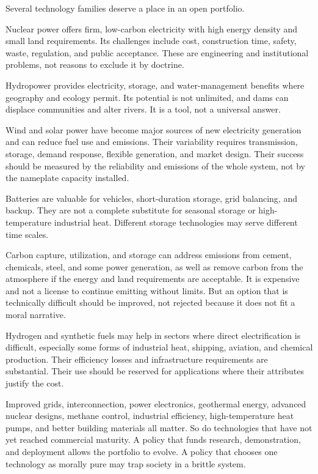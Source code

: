 ﻿\documentclass[12pt,a4paper]{book}
\begin{document}
Several technology families deserve a place in an open portfolio.

Nuclear power offers firm, low-carbon electricity with high energy density and small land requirements. Its challenges include cost, construction time, safety, waste, regulation, and public acceptance. These are engineering and institutional problems, not reasons to exclude it by doctrine.

Hydropower provides electricity, storage, and water-management benefits where geography and ecology permit. Its potential is not unlimited, and dams can displace communities and alter rivers. It is a tool, not a universal answer.

Wind and solar power have become major sources of new electricity generation and can reduce fuel use and emissions. Their variability requires transmission, storage, demand response, flexible generation, and market design. Their success should be measured by the reliability and emissions of the whole system, not by the nameplate capacity installed.

Batteries are valuable for vehicles, short-duration storage, grid balancing, and backup. They are not a complete substitute for seasonal storage or high-temperature industrial heat. Different storage technologies may serve different time scales.

Carbon capture, utilization, and storage can address emissions from cement, chemicals, steel, and some power generation, as well as remove carbon from the atmosphere if the energy and land requirements are acceptable. It is expensive and not a license to continue emitting without limits. But an option that is technically difficult should be improved, not rejected because it does not fit a moral narrative.

Hydrogen and synthetic fuels may help in sectors where direct electrification is difficult, especially some forms of industrial heat, shipping, aviation, and chemical production. Their efficiency losses and infrastructure requirements are substantial. Their use should be reserved for applications where their attributes justify the cost.

Improved grids, interconnection, power electronics, geothermal energy, advanced nuclear designs, methane control, industrial efficiency, high-temperature heat pumps, and better building materials all matter. So do technologies that have not yet reached commercial maturity. A policy that funds research, demonstration, and deployment allows the portfolio to evolve. A policy that chooses one technology as morally pure may trap society in a brittle system.
\end{document}
